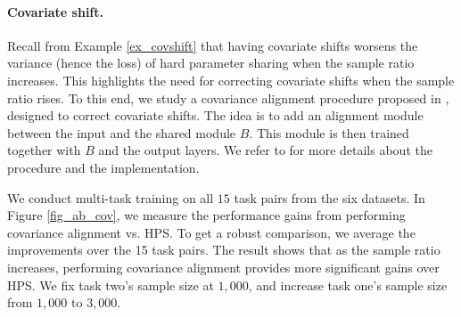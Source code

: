 

\paragraph{Covariate shift.}
Recall from Example \ref{ex_covshift} that having covariate shifts worsens the variance (hence the loss) of hard parameter sharing when the sample ratio increases.
This highlights the need for correcting covariate shifts when the sample ratio rises.
To this end, we study a covariance alignment procedure proposed in \citet{WZR20}, designed to correct covariate shifts.
The idea is to add an alignment module between the input and the shared module $B$.
This module is then trained together with $B$ and the output layers. We refer to \citet{WZR20} for more details about the procedure and the implementation.

We conduct multi-task training on all $15$ task pairs from the six datasets.
In Figure \ref{fig_ab_cov}, we measure the performance gains from performing covariance alignment vs. HPS.
To get a robust comparison, we average the improvements over the 15 task pairs.
The result shows that as the sample ratio increases, performing covariance alignment provides more significant gains over HPS.
We fix task two's sample size at $1,000$, and increase task one's sample size from $1,000$ to $3,000$.

